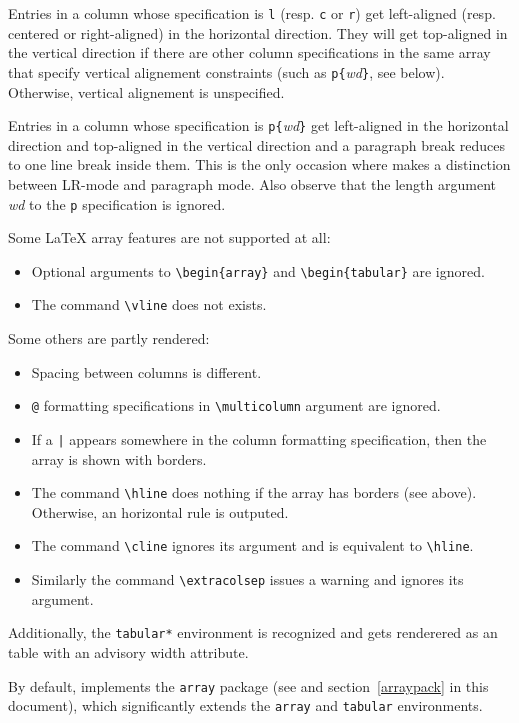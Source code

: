 Entries in a column whose specification is \verb+l+ (resp. \verb+c+ or
\verb+r+) get left-aligned (resp. centered or right-aligned)
in the horizontal direction.
They will get top-aligned in the vertical direction if there are
other column specifications in the
same array that specify vertical alignement constraints
(such as \verb+p{+\textit{wd}\verb+}+, see below).
Otherwise, vertical alignement is unspecified.

Entries in a column whose specification is \verb+p{+{\it wd}\verb+}+
get left-aligned in the horizontal direction and
top-aligned in the vertical direction
and a paragraph break reduces to one line break inside them.
This is the only occasion where
\hevea{} makes a distinction between LR-mode and paragraph mode.
Also observe that the length argument \textit{wd} to the \verb+p+
specification is ignored.


Some \LaTeX{} array features are not supported at all:
\begin{itemize}
\item Optional arguments to \verb+\begin{array}+ and
\verb+\begin{tabular}+ are ignored.
\item The command \verb+\vline+ does not exists.
\end{itemize}

Some others are partly rendered:
\begin{itemize}
\item Spacing between columns is different.
\item \verb+@+ formatting specifications in \verb+\multicolumn+
argument are ignored.
\item If a \verb+|+ appears somewhere in the column formatting
specification, then the array is shown with borders.
\item The command \verb+\hline+ does nothing if the array has borders
(see above). Otherwise, an horizontal rule is outputed.
\item The command \verb+\cline+ ignores its argument and is equivalent
to \verb+\hline+.
\item Similarly the command
\verb+\extracolsep+ issues a warning and ignores its argument.
\end{itemize}
Additionally, the \verb+tabular*+ environment is
recognized and gets renderered as an \html{} table with an advisory
width attribute.


By default, \hevea{} implements the \texttt{array} package
(see \cite[Section~5.3]{latexbis} and section~\ref{arraypack} in this
document), which significantly extends the
\verb+array+ and \verb+tabular+ environments.

